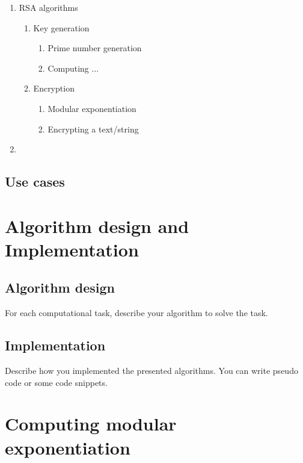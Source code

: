 \documentclass[12pt, a4paper]{report}
\begin{document}
		\begin{enumerate}
				\item RSA algorithms
				
						\begin{enumerate}
							\item Key generation
							
									\begin{enumerate}
										\item Prime number generation
										
										\item Computing ...
									\end{enumerate}
							
							\item Encryption
							
									\begin{enumerate}
										\item Modular exponentiation
										
										\item Encrypting a text/string
									
									\end{enumerate}
						\end{enumerate}
						
				\item 
		\end{enumerate}

\section{Use cases}


\chapter{Algorithm design and Implementation}

\section{Algorithm design}

For each computational task, describe your algorithm to solve the task.

\section{Implementation}

Describe how you implemented the presented algorithms. You can write pseudo code or some code snippets.

\appendix
\chapter{Computing modular exponentiation}


\end{document}
